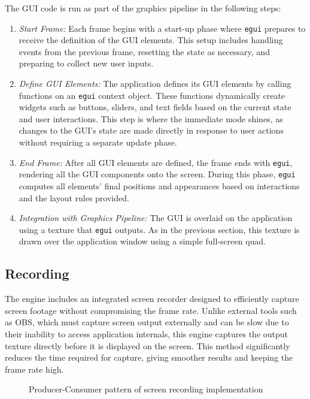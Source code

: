 The GUI code is run as part of the graphics pipeline in the following steps:
\begin{enumerate}
\item \emph{Start Frame:} Each frame begins with a start-up phase where \verb|egui| prepares to receive the definition of the GUI elements. This setup includes handling events from the previous frame, resetting the state as necessary, and preparing to collect new user inputs.

\item \emph{Define GUI Elements:} The application defines its GUI elements by calling functions on an \verb|egui| context object. These functions dynamically create widgets such as buttons, sliders, and text fields based on the current state and user interactions. This step is where the immediate mode shines, as changes to the GUI's state are made directly in response to user actions without requiring a separate update phase.

\item \emph{End Frame:} After all GUI elements are defined, the frame ends with \verb|egui|, rendering all the GUI components onto the screen. During this phase, \verb|egui| computes all elements' final positions and appearances based on interactions and the layout rules provided.

\item \emph{Integration with Graphics Pipeline:} The GUI is overlaid on the application using a texture that \verb|egui| outputs. As in the previous section, this texture is drawn over the application window using a simple full-screen quad.
\end{enumerate}

\subsection{Recording}

The engine includes an integrated screen recorder designed to efficiently capture screen footage without compromising the frame rate. Unlike external tools such as OBS, which must capture screen output externally and can be slow due to their inability to access application internals, this engine captures the output texture directly before it is displayed on the screen. This method significantly reduces the time required for capture, giving smoother results and keeping the frame rate high.

\begin{figure}[H]
  \centering
  
  \caption[Recording thread diagram]{Producer-Consumer pattern of screen recording implementation}
\end{figure}

